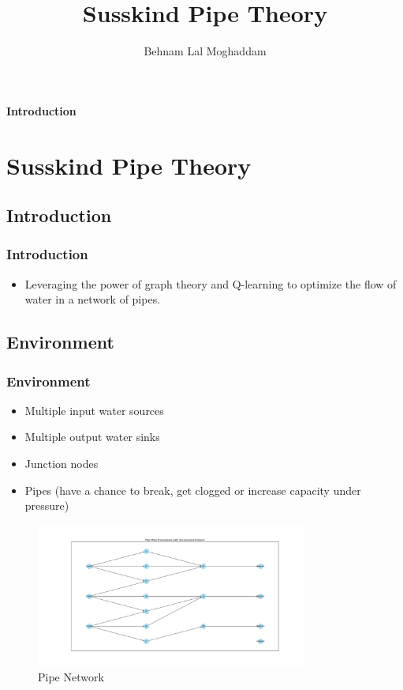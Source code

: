 \documentclass[notheorems, aspectratio=54]{beamer}
\title[Susskind Pipe Theory]{Susskind Pipe Theory}
\author{Behnam Lal Moghaddam}
\institute[Behnam Lal]{info@behnamlal.xyz}
\begin{document}
\begin{frame}
	\titlepage
\end{frame}

\begin{frame}
	\begin{center}
		\huge \textbf{Introduction}
	\end{center}
\end{frame}

\section{Susskind Pipe Theory}

\subsection{Introduction}
\begin{frame}
	\frametitle{Introduction}
	\begin{itemize}
		\item Leveraging the power of graph theory and Q-learning to optimize the flow of water in a network of pipes.
	\end{itemize}
\end{frame}

\subsection{Environment}
\begin{frame}
	\frametitle{Environment}
	\begin{itemize}
		\item Multiple input water sources
		\item Multiple output water sinks
		\item Junction nodes
		\item Pipes (have a chance to break, get clogged or increase capacity under pressure)
	\end{itemize}
	\begin{figure}
		\centering
		\includegraphics[width=0.8\textwidth]{fig-02.png}
		\caption{Pipe Network}
	\end{figure}
\end{frame}
\end{document}
